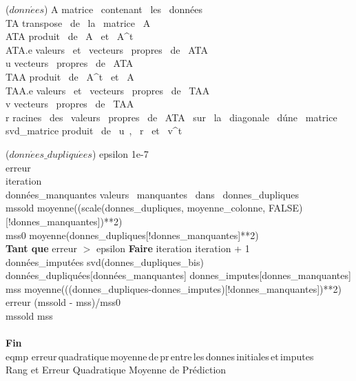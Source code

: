\documentclass[12pt, openany, fleqn, french]{article}
\renewcommand{\algorithmicend}{\textbf{Fin}}
\renewcommand{\algorithmicdo}{\textbf{Faire}}
\renewcommand{\algorithmicwhile}{\textbf{Tant que}}
\begin{document}
\begin{algorithm}[H]
\footnotesize
     {($donn\acute{e}es$)}
    \State A \gets matrice \, contenant \, les \, données \\
  \State TA \gets transpose \, de \, la \, matrice \, A\\
  \State ATA \gets produit \, de \, A \, et \, A^{t}\\
  \State ATA.e \gets valeurs \, et \, vecteurs \, propres \, de \, ATA\\
  \State u \gets vecteurs \, propres \, de \, ATA\\
  \State TAA \gets produit \, de \, A^{t} \, et \, A \\
  \State TAA.e \gets valeurs \, et \, vecteurs \, propres \, de \, TAA\\
  \State v \gets vecteurs \, propres \, de \, TAA\\
  \State r \gets racines \, des \, valeurs \, propres \, de \, ATA \, sur \, la \, diagonale \, d\'une \, matrice\\
  \State svd\_matrice \gets produit \, de \, u \,, \, r \, et \, v^{t}\\
  \EndFunction
\end{algorithm}

\begin{algorithm}[H]
\footnotesize
     {($donn\acute{e}es\_dupliqu\acute{e}es$)}
    \State epsilon \gets 1e-7 \\
  \State erreur \\
  \State iteration \\
  \State données\_manquantes \gets valeurs \, manquantes \, dans \, donnes\_dupliques\\
  \State mssold \gets moyenne((scale(donnes\_dupliques, moyenne\_colonne, FALSE)[!donnes\_manquantes])**2)\\
  \State mss0 \gets moyenne(donnes\_dupliques[!donnes\_manquantes]**2)\\
  \State \algorithmicwhile{ erreur $>$ epsilon }\algorithmicdo{
    \State iteration \gets iteration + 1\\
    \State données\_imputées \gets svd(donnes\_dupliques\_bis)\\
    \State données\_dupliquées[données\_manquantes] \gets donnes\_imputes[donnes\_manquantes]\\
    \State mss \gets moyenne(((donnes\_dupliques-donnes\_imputes)[!donnes\_manquantes])**2) \\
    \State erreur \gets (mssold - mss)/mss0 \\
    \State mssold \gets mss\\
  }\\ 
  \algorithmicend\\
  \State eqmp \gets erreur\,quadratique\,moyenne\,de\,pr\,entre\,les\,donnes\,initiales\,et\,imputes\\
  \State \Return Rang et Erreur Quadratique Moyenne de Prédiction\\
  \EndFunction
\end{algorithm}
\end{document}
